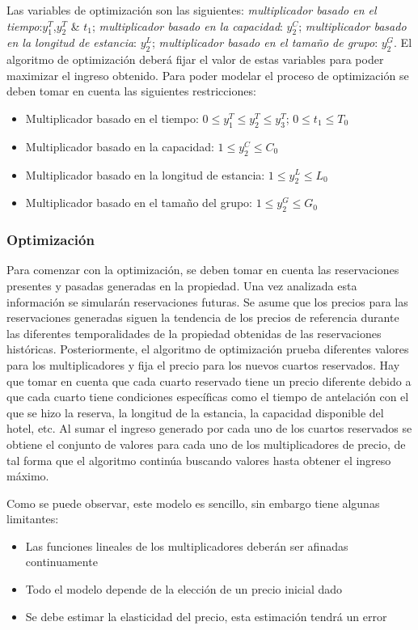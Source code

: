 {{{Las variables de optimización son las siguientes: \emph{multiplicador basado en el tiempo}:$y_1^T$,$y_2^T$ \& $t_1$; \emph{multiplicador basado en la capacidad}: $y_2^C$; \emph{multiplicador basado en la longitud de estancia}: $y_2^L$; \emph{multiplicador basado en el tamaño de grupo}: $y_2^G$. El algoritmo de optimización deberá fijar el valor de estas variables para poder maximizar el ingreso obtenido.
Para poder modelar el proceso de optimización se deben tomar en cuenta las siguientes restricciones:

\begin{itemize}
  \item Multiplicador basado en el tiempo: $0 \leq y_1^T \leq y_2^T \leq y_3^T$; $0 \leq t_1 \leq T_0$
  \item Multiplicador basado en la capacidad: $1 \leq y_2^C \leq C_0$
  \item Multiplicador basado en la longitud de estancia: $1 \leq y_2^L \leq L_0$
  \item Multiplicador basado en el tamaño del grupo: $1 \leq y_2^G \leq G_0$
\end{itemize}

\subsubsection*{Optimización}

Para comenzar con la optimización, se deben tomar en cuenta las reservaciones presentes y pasadas generadas en la propiedad. Una vez analizada esta información se simularán reservaciones futuras. Se asume que los precios para las reservaciones generadas siguen la tendencia de los precios de referencia durante las diferentes temporalidades de la propiedad obtenidas de las reservaciones históricas. Posteriormente, el algoritmo de optimización prueba diferentes valores para los multiplicadores y fija el precio para los nuevos cuartos reservados. Hay que tomar en cuenta que cada cuarto reservado tiene un precio diferente debido a que cada cuarto tiene condiciones específicas como el tiempo de antelación con el que se hizo la reserva, la longitud de la estancia, la capacidad disponible del hotel, etc. Al sumar el ingreso generado por cada uno de los cuartos reservados se obtiene el conjunto de valores para cada uno de los multiplicadores de precio, de tal forma que el algoritmo continúa buscando valores hasta obtener el ingreso máximo.

Como se puede observar, este modelo es sencillo, sin embargo tiene algunas limitantes:
\begin{itemize}
  \item Las funciones lineales de los multiplicadores deberán ser afinadas continuamente
  \item Todo el modelo depende de la elección de un precio inicial dado
  \item Se debe estimar la elasticidad del precio, esta estimación tendrá un error
\end{itemize}

}}}
